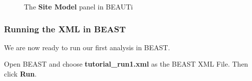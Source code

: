 \documentclass[11pt]{article}
\begin{document}
\begin{figure}[!h]
\centering
{}
\caption{\small The \textbf{Site Model} panel in BEAUTi}
\label{fig:beauti_run1}
\end{figure}

\bigskip
\subsubsection{Running the XML in BEAST}

We are now ready to run our first analysis in BEAST.

\begin{framed}
Open BEAST and choose \textbf{tutorial\_run1.xml} as the BEAST XML File. Then click \textbf{Run}.
\end{framed}
\end{document}
